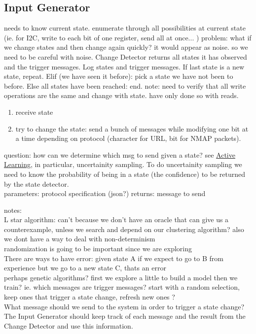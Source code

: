 \documentclass[11pt, a4paper]{article}
\begin{document}
\subsection*{Input Generator}

needs to know current state.
enumerate through all possibilities at current state (ie. for I2C, write to each bit of one register, send all at once... )
problem: what if we change states and then change again quickly? it would appear as noise. so we need to be careful with noise.
Change Detector returns all states it has observed and the trigger messages.
Log states and trigger messages.
If last state is a new state, repeat. 
Elif (we have seen it before): pick a state we have not been to before.
Else all states have been reached: end.
note: need to verify that all write operations are the same and change with state. have only done so with reads.

\begin{enumerate}
    \item receive state
    \item try to change the state: send a bunch of messages while modifying one bit at a time depending on protocol (character for URL, bit for NMAP packets).
\end{enumerate}

question: how can we determine which msg to send given a state? see \href{https://en.wikipedia.org/wiki/Active_learning_(machine_learning)}{Active Learning}, in particular, uncertainity sampling.
To do uncertainity sampling we need to know the probability of being in a state (the confidence) to be returned by the state detector. \\

parameters: protocol specification (json?)
returns: message to send

notes:\\
L star algorithm: can't because we don't have an oracle that can give us a counterexample, unless we search and depend on our clustering algorithm?
also we dont have a way to deal with non-determinism\\
randomization is going to be important since we are exploring\\
There are ways to have error: given state A if we expect to go to B from experience but we go to a new state C, thats an error\\
perhaps genetic algorithms? first we explore a little to build a model then we train? 
ie. which messages are trigger messages? start with a random selection,
keep ones that trigger a state change, 
refresh new ones ? \\
What message should we send to the system in order to trigger a state change?
The Input Generator should keep track of each message and the result from the Change Detector and use this information.
\end{document}
